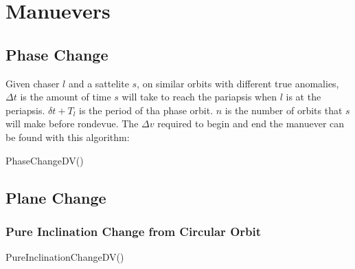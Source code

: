 \section{Manuevers}
\subsection{Phase Change}
Given chaser $l$ and a sattelite $s$, on similar orbits with different true anomalies, $\Delta{}t$ is the amount of time $s$
will take to reach the pariapsis when $l$ is at the periapsis. $\delta{}t + T_{l}$ is the period of tha phase orbit.
$n$ is the number of orbits that $s$ will make before rondevue. The $\Delta{}v$ required to begin and end the manuever
can be found with this algorithm:
\begin{function}
    \DontPrintSemicolon
    \caption{PhaseChangeDV()}
\end{function}

\subsection{Plane Change}
\subsubsection{Pure Inclination Change from Circular Orbit}
\begin{function}
    \DontPrintSemicolon
    \caption{PureInclinationChangeDV()}
\end{function}
